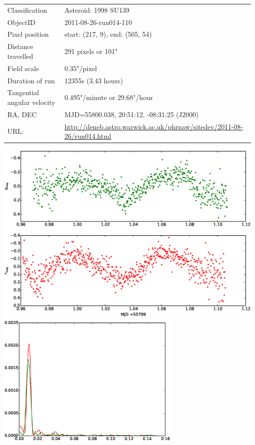   \begin{tabular}{l l}
  Classification & Asteroid: 1998 SU139 \\
  ObjectID & 2011-08-26-run014-110 \\
  Pixel position & start: (217, 9), end: (505, 54) \\
  Distance travelled & 291 pixels or 101" \\
  Field scale & 0.35"/pixel \\
  Duration of run & 12355s (3.43 hours) \\
  Tangential angular velocity & 0.495"/minute or 29.68"/hour\\ 
  RA, DEC & MJD=55800.038, 20:51:12, -08:31:25 (J2000) \\
  URL: & \small \url{http://deneb.astro.warwick.ac.uk/phrnaw/sitedev/2011-08-26/run014.html} \\
  \end{tabular}
  \includegraphics[width=140mm]{images/2011-08-26-run014-110-lightcurve.eps} \\
  \includegraphics[width=90mm]{images/asteroid_pgram.eps} \\

